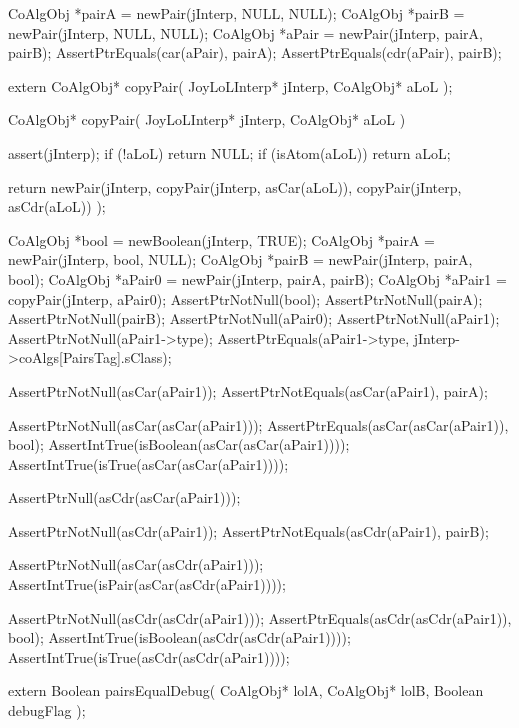 \startCTest
  CoAlgObj *pairA = newPair(jInterp, NULL, NULL);
  CoAlgObj *pairB = newPair(jInterp, NULL, NULL);
  CoAlgObj *aPair = newPair(jInterp, pairA, pairB);
  AssertPtrEquals(car(aPair), pairA);
  AssertPtrEquals(cdr(aPair), pairB);
\stopCTest
\stopTestCase
\stopTestSuite

\startTestSuite[copyPair]

\startCHeader
extern CoAlgObj* copyPair(
  JoyLoLInterp* jInterp,
  CoAlgObj* aLoL
);
\stopCHeader

\startCCode
CoAlgObj* copyPair(
  JoyLoLInterp* jInterp,
  CoAlgObj* aLoL
) {
  assert(jInterp);
  if (!aLoL) return NULL;
  if (isAtom(aLoL)) return aLoL;

  return newPair(jInterp,
                 copyPair(jInterp, asCar(aLoL)),
                 copyPair(jInterp, asCdr(aLoL))
                 );
}
\stopCCode


\startCTest
  CoAlgObj *bool   = newBoolean(jInterp, TRUE);
  CoAlgObj *pairA  = newPair(jInterp, bool, NULL);
  CoAlgObj *pairB  = newPair(jInterp, pairA, bool);
  CoAlgObj *aPair0 = newPair(jInterp, pairA, pairB);
  CoAlgObj *aPair1 = copyPair(jInterp, aPair0);
  AssertPtrNotNull(bool);
  AssertPtrNotNull(pairA);
  AssertPtrNotNull(pairB);
  AssertPtrNotNull(aPair0);
  AssertPtrNotNull(aPair1);
  AssertPtrNotNull(aPair1->type);
  AssertPtrEquals(aPair1->type, jInterp->coAlgs[PairsTag].sClass);

  AssertPtrNotNull(asCar(aPair1));
  AssertPtrNotEquals(asCar(aPair1), pairA);

  AssertPtrNotNull(asCar(asCar(aPair1)));
  AssertPtrEquals(asCar(asCar(aPair1)), bool);
  AssertIntTrue(isBoolean(asCar(asCar(aPair1))));
  AssertIntTrue(isTrue(asCar(asCar(aPair1))));

  AssertPtrNull(asCdr(asCar(aPair1)));

  AssertPtrNotNull(asCdr(aPair1));
  AssertPtrNotEquals(asCdr(aPair1), pairB);

  AssertPtrNotNull(asCar(asCdr(aPair1)));
  AssertIntTrue(isPair(asCar(asCdr(aPair1))));

  AssertPtrNotNull(asCdr(asCdr(aPair1)));
  AssertPtrEquals(asCdr(asCdr(aPair1)), bool);
  AssertIntTrue(isBoolean(asCdr(asCdr(aPair1))));
  AssertIntTrue(isTrue(asCdr(asCdr(aPair1))));
\stopCTest
\stopTestCase
\stopTestSuite


\startTestSuite[equalLoL]

\startCHeader
extern Boolean pairsEqualDebug(
  CoAlgObj* lolA,
  CoAlgObj* lolB,
  Boolean debugFlag
);


